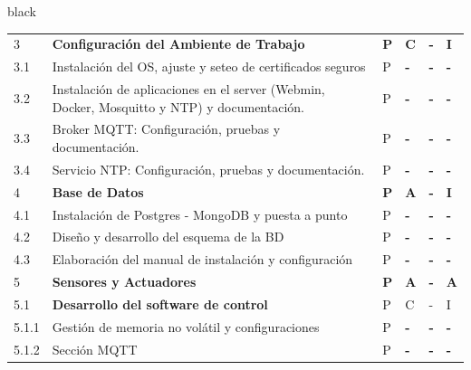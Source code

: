 \documentclass[11pt]{charter}
\begin{document}
\begin{consigna}{black}
\begin{tabularx}{\linewidth}{@{}|p{1.3cm}|p{10cm}|p{3cm}|p{3cm}|p{3cm}|p{3cm}|@{}}
3                      & \textbf{Configuración del Ambiente de   Trabajo}                                              & \textbf{P} & \textbf{C} & \textbf{-} & \textbf{I} \\
3.1                    & Instalación del OS, ajuste y   seteo de certificados seguros                                  & P          & \textbf{-} & \textbf{-} & \textbf{-} \\
3.2                    & Instalación de aplicaciones en   el server (Webmin, Docker, Mosquitto y NTP) y documentación. & P          & \textbf{-} & \textbf{-} & \textbf{-} \\
3.3                    & Broker MQTT: Configuración,   pruebas y documentación.                                        & P          & \textbf{-} & \textbf{-} & \textbf{-} \\
3.4                    & Servicio NTP: Configuración,   pruebas y documentación.                                       & P          & \textbf{-} & \textbf{-} & \textbf{-} \\
4                      & \textbf{Base de Datos}                                                                        & \textbf{P} & \textbf{A} & \textbf{-} & \textbf{I} \\
4.1                    & Instalación de Postgres -   MongoDB y puesta a punto                                          & P          & \textbf{-} & \textbf{-} & \textbf{-} \\
4.2                    & Diseño y desarrollo del esquema   de la BD                                                    & P          & \textbf{-} & \textbf{-} & \textbf{-} \\
4.3                    & Elaboración del manual de   instalación y configuración                                       & P          & \textbf{-} & \textbf{-} & \textbf{-} \\
5                      & \textbf{Sensores y Actuadores}                                                                & \textbf{P} & \textbf{A} & \textbf{-} & \textbf{A} \\
5.1                    & \textbf{Desarrollo del software de   control}                                                 & P          & C          & -          & I          \\
5.1.1                  & Gestión de memoria no volátil y   configuraciones                                             & P          & \textbf{-} & \textbf{-} & \textbf{-} \\
5.1.2                  & Sección MQTT                                                                                  & P          & \textbf{-} & \textbf{-} & \textbf{-} \\

\end{tabularx}
\end{consigna}
\end{document}
